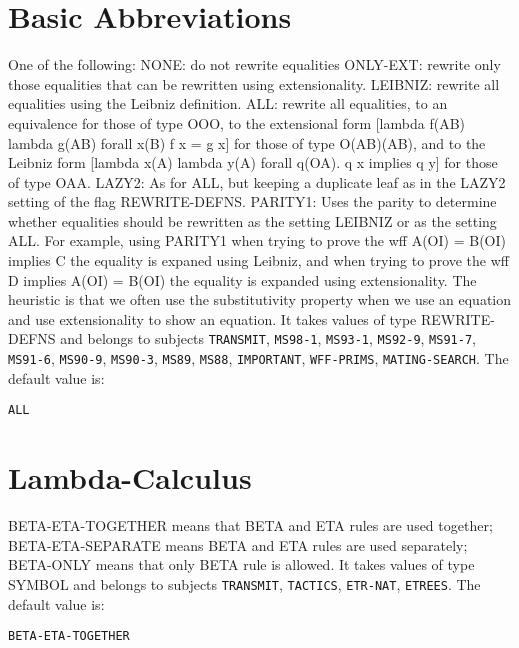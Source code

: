 \section{Basic Abbreviations}

\begin{description} 
\item[REWRITE-EQUALITIES]  
One of the following:
NONE: do not rewrite equalities
ONLY-EXT: rewrite only those equalities that can be rewritten using
          extensionality.
LEIBNIZ: rewrite all equalities using the Leibniz definition.
ALL: rewrite all equalities, to an equivalence for those of type OOO,
     to the extensional form 
      [lambda f(AB) lambda g(AB) forall x(B) f x = g x]
     for those of type O(AB)(AB), and to the Leibniz form
      [lambda x(A) lambda y(A) forall q(OA). q x implies q y]
     for those of type OAA.
LAZY2: As for ALL, but keeping a duplicate leaf as in the LAZY2
       setting of the flag REWRITE-DEFNS.
PARITY1: Uses the parity to determine whether equalities should be
    rewritten as the setting LEIBNIZ or as the setting ALL.  For example,
    using PARITY1 when trying to prove the wff 
              A(OI) = B(OI) implies C
    the equality is expaned using Leibniz, and when trying to prove the wff
              D implies A(OI) = B(OI)
    the equality is expanded using extensionality.  The heuristic
    is that we often use the substitutivity property when we use an equation
    and use extensionality to show an equation.
It takes values of type REWRITE-DEFNS and belongs to subjects \texttt{TRANSMIT}, \texttt{MS98-1}, \texttt{MS93-1}, \texttt{MS92-9}, \texttt{MS91-7}, \texttt{MS91-6}, \texttt{MS90-9}, \texttt{MS90-3}, \texttt{MS89}, \texttt{MS88}, \texttt{IMPORTANT}, \texttt{WFF-PRIMS}, \texttt{MATING-SEARCH}.  The default value is: \begin{lstlisting}
ALL
\end{lstlisting}

\item
\end{description}

\section{Lambda-Calculus}

\begin{description} 
\item[LAMBDA-CONV]  
BETA-ETA-TOGETHER means that BETA and ETA rules are used together; 
BETA-ETA-SEPARATE means BETA and ETA rules are used separately; BETA-ONLY 
means that only BETA rule is allowed.
It takes values of type SYMBOL and belongs to subjects \texttt{TRANSMIT}, \texttt{TACTICS}, \texttt{ETR-NAT}, \texttt{ETREES}.  The default value is: \begin{lstlisting}
BETA-ETA-TOGETHER
\end{lstlisting}

\item
\end{description}

